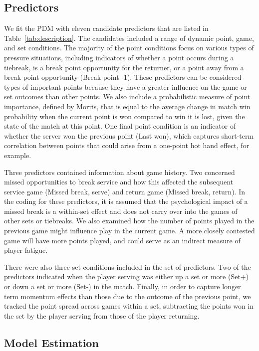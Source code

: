 \documentclass{Latex/svjour3}
\begin{document}
\subsection{Predictors}

We fit the PDM with eleven candidate predictors that are listed in
Table~\ref{tab:description}. The candidates included a range of dynamic
point, game, and set conditions. The majority of the point conditions
focus on various types of pressure situations, including
indicators of whether a point occurs during a tiebreak, is a
break point opportunity for the returner, or a point away from a break
point opportunity (Break point -1). These predictors can be considered types of
important points because they have a greater influence on the game or
set outcomes than other points. We also include a probabilistic measure of
point importance, defined by Morris\cite{morris1977most}, that is equal to the
average change in match win probability when the current point is won
compared to win it is lost, given the state of the match at this
point. One final point
condition is an indicator of whether the server won the previous point
(Last won), which captures short-term correlation between points that
could arise from a one-point hot hand effect, for example. 

Three predictors contained information about game history. Two
concerned missed opportunities to break service and how this affected
the subsequent service game (Missed break, serve) and return game
(Missed break, return). In the coding for these predictors, it is
assumed that the psychological impact of a missed break is a
within-set effect and does not carry over into the games of other sets
or tiebreaks.  We
also examined how the number of points played in the previous game
might influence play in the current game. A more closely contested
game will have more points played, and could serve as an indirect
measure of player fatigue. 

There were also three set conditions included in the set of
predictors. Two of the predictors indicated when the player serving
was either up a set or more (Set+) or down a set or more (Set-) in the
match. Finally, in order to capture longer term
momentum effects than those due to the outcome of the previous point,
we tracked the point spread across games within a set, subtracting the
points won in the set by the player serving from those of the player
returning. 


\subsection{Model Estimation}
\end{document}

